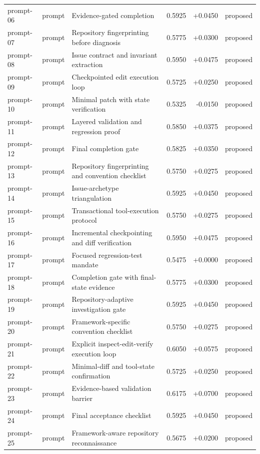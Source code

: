 \begin{center}
\begin{longtable}{llp{5.2cm}rrl}
prompt-06 & prompt & Evidence-gated completion & 0.5925 & +0.0450 & proposed \\
prompt-07 & prompt & Repository fingerprinting before diagnosis & 0.5775 & +0.0300 & proposed \\
prompt-08 & prompt & Issue contract and invariant extraction & 0.5950 & +0.0475 & proposed \\
prompt-09 & prompt & Checkpointed edit execution loop & 0.5725 & +0.0250 & proposed \\
prompt-10 & prompt & Minimal patch with state verification & 0.5325 & -0.0150 & proposed \\
prompt-11 & prompt & Layered validation and regression proof & 0.5850 & +0.0375 & proposed \\
prompt-12 & prompt & Final completion gate & 0.5825 & +0.0350 & proposed \\
prompt-13 & prompt & Repository fingerprinting and convention checklist & 0.5750 & +0.0275 & proposed \\
prompt-14 & prompt & Issue-archetype triangulation & 0.5925 & +0.0450 & proposed \\
prompt-15 & prompt & Transactional tool-execution protocol & 0.5750 & +0.0275 & proposed \\
prompt-16 & prompt & Incremental checkpointing and diff verification & 0.5950 & +0.0475 & proposed \\
prompt-17 & prompt & Focused regression-test mandate & 0.5475 & +0.0000 & proposed \\
prompt-18 & prompt & Completion gate with final-state evidence & 0.5775 & +0.0300 & proposed \\
prompt-19 & prompt & Repository-adaptive investigation gate & 0.5925 & +0.0450 & proposed \\
prompt-20 & prompt & Framework-specific convention checklist & 0.5750 & +0.0275 & proposed \\
prompt-21 & prompt & Explicit inspect-edit-verify execution loop & 0.6050 & +0.0575 & proposed \\
prompt-22 & prompt & Minimal-diff and tool-state confirmation & 0.5725 & +0.0250 & proposed \\
prompt-23 & prompt & Evidence-based validation barrier & 0.6175 & +0.0700 & proposed \\
prompt-24 & prompt & Final acceptance checklist & 0.5925 & +0.0450 & proposed \\
prompt-25 & prompt & Framework-aware repository reconnaissance & 0.5675 & +0.0200 & proposed \\

\end{longtable}
\end{center}
